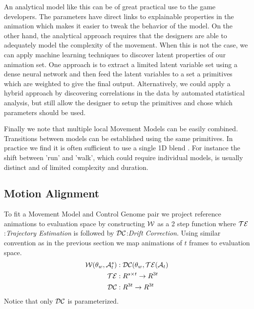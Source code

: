 An analytical model like this can be of great practical use to the game developers. The parameters have direct links to explainable properties in the animation which makes it easier to tweak the behavior of the model. On the other hand, the analytical approach requires that the designers are able to adequately model the complexity of the movement. 
%
When this is not the case, we can apply machine learning techniques to discover latent properties of our animation set. %
One approach is to extract a limited latent variable set using a dense neural network and then feed the latent variables to a set a primitives which are weighted to give the final output. 
Alternatively, we could apply a hybrid approach by discovering correlations in the data by automated statistical analysis, but still allow the designer to setup the primitives and chose which parameters should be used. 

Finally we note that multiple local Movement Models can be easily combined. Transitions between models can be established using the same primitives. In practice we find it is often sufficient to use a single 1D blend . For instance the shift between 'run' and 'walk', which could require individual models, is usually distinct and of limited complexity and duration. 

\subsection{Motion Alignment}
To fit a Movement Model and Control Genome pair we project reference animations to evaluation space by constructing $\mathcal{W}$ as a 2 step function where $\mathcal{TE}$:\textit{Trajectory Estimation} is followed by $\mathcal{DC}$:\textit{Drift Correction}. Using similar convention as in the previous section we map animations of $t$ frames to evaluation space. 
\begin{subequations}
\begin{align}
    \mathcal{W}(\theta_{w},\mathcal{A}_{t}^{s})&:\mathcal{DC}(\theta_{w},\mathcal{TE}(\mathcal{A}_t)\\
    \mathcal{TE}&:R^{s\times{t}} \rightarrow  R^{3t}\\
    \mathcal{DC}&:R^{3t} \rightarrow R^{3t}
\end{align}
\end{subequations}
Notice that only $\mathcal{DC}$ is parameterized.


